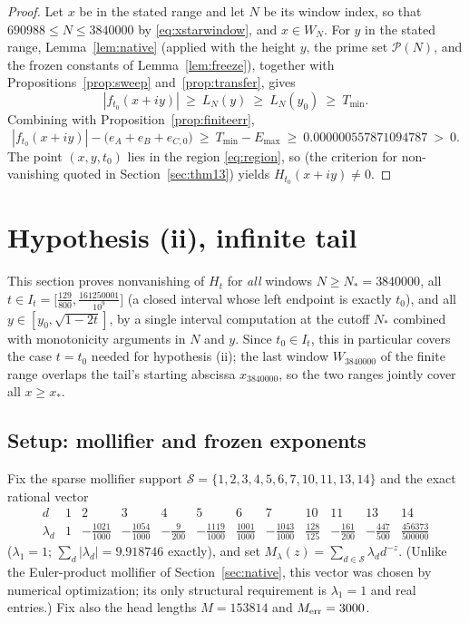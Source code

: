 \documentclass[11pt]{article}
\theoremstyle{definition}
\newcommand{\calP}{\mathcal{P}}
\newcommand{\calS}{\mathcal{S}}
\begin{document}
\begin{proof}
Let $x$ be in the stated range and let $N$ be its window index, so
that $690988\le N\le3840000$ by \eqref{eq:xstarwindow}, and
$x\in W_N$. For $y$ in the stated range, Lemma~\ref{lem:native}
(applied with the height $y$, the prime set $\calP(N)$, and the
frozen constants of Lemma~\ref{lem:freeze}), together with
Propositions~\ref{prop:sweep} and~\ref{prop:transfer}, gives
\[
|f_{t_0}(x+iy)|\ \ge\ L_N(y)\ \ge\ L_N(y_0)\ \ge\ T_{\min}.
\]
Combining with Proposition~\ref{prop:finiteerr},
\begin{equation}\label{eq:finitemargin}
|f_{t_0}(x+iy)|-\bigl(e_A+e_B+e_{C,0}\bigr)
\ \ge\ T_{\min}-E_{\max}
\ \ge\ 0.000000557871094787\ >\ 0 .
\end{equation}
The point $(x,y,t_0)$ lies in the region \eqref{eq:region}, so
\cite[Corollary~1.4]{Polymath} (the criterion for non-vanishing
quoted in Section~\ref{sec:thm13}) yields
$H_{t_0}(x+iy)\neq0$.
\end{proof}

\section{Hypothesis (ii), infinite tail}\label{sec:tail}

This section proves nonvanishing of $H_t$ for \emph{all} windows
$N\ge N_*=3840000$, all
$t\in I_t=\bigl[\frac{129}{800},\frac{161250001}{10^9}\bigr]$ (a
closed interval whose left endpoint is exactly $t_0$), and all
$y\in[y_0,\sqrt{1-2t}]$, by a single interval computation at the
cutoff $N_*$ combined with monotonicity arguments in $N$ and $y$.
Since $t_0\in I_t$, this in particular covers the case $t=t_0$
needed for hypothesis (ii); the last window $W_{3840000}$ of the
finite range overlaps the tail's starting abscissa $x_{3840000}$, so
the two ranges jointly cover all $x\ge x_*$.

\subsection{Setup: mollifier and frozen exponents}

Fix the sparse mollifier support
$\calS=\{1,2,3,4,5,6,7,10,11,13,14\}$ and the exact rational vector
\[
\begin{array}{c|ccccccccccc}
d&1&2&3&4&5&6&7&10&11&13&14\\ \hline
\lambda_d&
1&-\frac{1021}{1000}&-\frac{1054}{1000}&-\frac{9}{200}&
-\frac{1119}{1000}&\frac{1001}{1000}&-\frac{1043}{1000}&
\frac{128}{125}&-\frac{161}{200}&-\frac{447}{500}&\frac{456373}{500000}
\end{array}
\]
($\lambda_1=1$; $\sum_d|\lambda_d|=9.918746$ exactly), and set
$M_\lambda(z)=\sum_{d\in\calS}\lambda_d d^{-z}$. (Unlike the Euler-product
mollifier of Section~\ref{sec:native}, this vector was chosen by numerical optimization;
its only structural requirement is $\lambda_1=1$ and real entries.)
Fix also the head lengths $M=153814$ and $M_{\rm err}=3000$.
\end{document}

